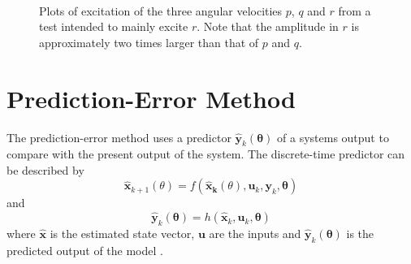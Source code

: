 \begin{figure}[htbp]
  \centering
  \qquad
  \\
  \caption{\label{fig:rTest}%
 Plots of excitation of the three angular velocities $p$, $q$ and $r$ from a test intended to mainly excite $r$. Note that the amplitude in $r$ is approximately two times larger than that of $p$ and $q$.}
\end{figure}

\section{Prediction-Error Method}
The prediction-error method uses a predictor $\hat{\boldsymbol{y}}_k(\boldsymbol{\theta})$ of a systems output to compare with the present output of the system. The discrete-time predictor can be described by 
\begin{equation}
\hat{\boldsymbol{x}}_{k+1}(\theta) = f(\boldsymbol{\hat{x}_k}(\theta), \boldsymbol{u}_k,\boldsymbol{y}_k, \boldsymbol{\theta})
\end{equation}
and
\begin{equation}
\hat{\boldsymbol{y}}_k(\boldsymbol{\theta}) = h(\hat{\boldsymbol{x}}_k, \boldsymbol{u}_k, \boldsymbol{\theta})
\end{equation}
where $\hat{\boldsymbol{x}}$ is the estimated state vector, $\boldsymbol{u}$ are the inputs and $\hat{\boldsymbol{y}}_k(\boldsymbol{\theta})$ is the predicted output of the model \citep[p. 13]{Roger}. 

